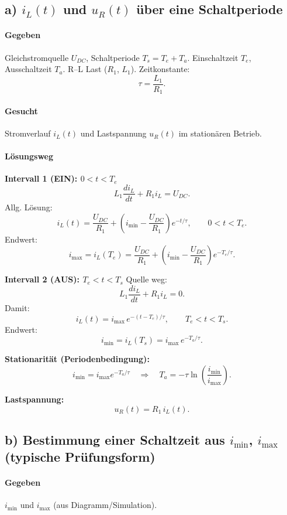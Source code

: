 \subsection*{a) $i_L(t)$ und $u_R(t)$ über eine Schaltperiode}

\paragraph{Gegeben}
Gleichstromquelle $U_{DC}$, Schaltperiode $T_s=T_e+T_a$.
Einschaltzeit $T_e$, Ausschaltzeit $T_a$.
R--L Last ($R_1$, $L_1$). Zeitkonstante:
\[
\boxed{\tau=\frac{L_1}{R_1}}.
\]

\paragraph{Gesucht}
Stromverlauf $i_L(t)$ und Lastspannung $u_R(t)$ im stationären Betrieb.

\paragraph{Lösungsweg}
\textbf{Intervall 1 (EIN): $0<t<T_e$}
\[
L_1\frac{di_L}{dt}+R_1 i_L = U_{DC}.
\]
Allg. Lösung:
\[
\boxed{
i_L(t)=\frac{U_{DC}}{R_1}+\left(i_{\min}-\frac{U_{DC}}{R_1}\right)e^{-t/\tau}
},\qquad 0<t<T_e.
\]
Endwert:
\[
\boxed{
i_{\max}=i_L(T_e)=\frac{U_{DC}}{R_1}+\left(i_{\min}-\frac{U_{DC}}{R_1}\right)e^{-T_e/\tau}.
}
\]

\textbf{Intervall 2 (AUS): $T_e<t<T_s$}
Quelle weg:
\[
L_1\frac{di_L}{dt}+R_1 i_L = 0.
\]
Damit:
\[
\boxed{
i_L(t)= i_{\max}\,e^{-(t-T_e)/\tau}
},\qquad T_e<t<T_s.
\]
Endwert:
\[
\boxed{
i_{\min}=i_L(T_s)=i_{\max}\,e^{-T_a/\tau}.
}
\]

\textbf{Stationarität (Periodenbedingung):}
\[
i_{\min}=i_{\max}e^{-T_a/\tau}
\quad\Rightarrow\quad
\boxed{T_a=-\tau\ln\!\left(\frac{i_{\min}}{i_{\max}}\right)}.
\]

\textbf{Lastspannung:}
\[
\boxed{u_R(t)=R_1\, i_L(t)}.
\]


\subsection*{b) Bestimmung einer Schaltzeit aus $i_{\min}$, $i_{\max}$ (typische Prüfungsform)}

\paragraph{Gegeben}
$i_{\min}$ und $i_{\max}$ (aus Diagramm/Simulation).

